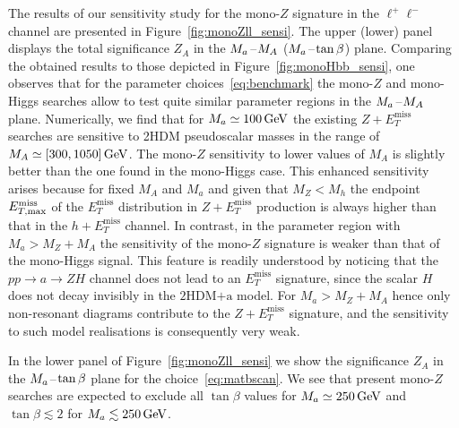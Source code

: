 \documentclass[a4paper, 11pt,notoc]{article}
\newcommand{\MET}{\ensuremath{E_T^\mathrm{miss}}\xspace}
\newcommand{\mA}{\ensuremath{M_{A}}\xspace}
\newcommand{\ma}{\ensuremath{M_{a}}\xspace}
\newcommand{\hdma}{\ensuremath{\textrm{2HDM+a}}\xspace}
\begin{document}
The results of our sensitivity study for the mono-$Z$ signature in the $\ell^+ \ell^-$ channel are presented in Figure~\ref{fig:monoZll_sensi}. The upper (lower) panel displays the total significance $Z_A$  in the $\ma\hspace{0.25mm}$--$\hspace{0.25mm}\mA$ ($\ma\hspace{0.25mm}$--$\hspace{0.25mm}\tan \beta$) plane. Comparing the obtained results to those depicted in Figure~\ref{fig:monoHbb_sensi}, one observes that for the parameter choices~\eqref{eq:benchmark} the mono-$Z$ and mono-Higgs searches allow to test quite similar parameter regions in the $\ma\hspace{0.25mm}$--$\hspace{0.25mm}\mA$ plane. Numerically, we find  that for $\ma \simeq 100 \, {\rm GeV}$  the existing $Z + \MET$ searches are sensitive to 2HDM pseudoscalar masses  in the range of $\mA \simeq [300, 1050] \, {\rm GeV}$. The mono-$Z$ sensitivity to lower values of $M_A$ is slightly better than the one found in the mono-Higgs case. This enhanced sensitivity arises because for fixed $M_A$ and $M_a$ and given that $M_Z < M_h$ the endpoint $E_{T, \rm max}^{\rm miss}$ of the $\MET$ distribution in $Z+ \MET$ production is always higher  than that in  the $h+ \MET$ channel. In contrast, in the parameter region with $M_a > M_Z + M_A$ the sensitivity of the mono-$Z$ signature is weaker than that of the mono-Higgs  signal. This feature is readily understood by noticing that the $pp \to a \to Z H$ channel does not lead to an $\MET$ signature, since the scalar $H$ does not decay invisibly in the \hdma model. For $M_a > M_Z + M_A$ hence only non-resonant diagrams contribute to the $Z+\MET$ signature, and the sensitivity to such model realisations is consequently very weak. 

 In the lower panel of Figure~\ref{fig:monoZll_sensi} we show the significance $Z_A$ in the $\ma\hspace{0.25mm}$--$\hspace{0.25mm}\tan \beta$ plane for the choice~\eqref{eq:matbscan}.  We see that present mono-$Z$ searches are expected to exclude all $\tan \beta$ values for $M_a \simeq 250 \, {\rm GeV}$ and $\tan \beta \lesssim 2$ for $M_a \lesssim 250 \, {\rm GeV}$. 
\end{document}
